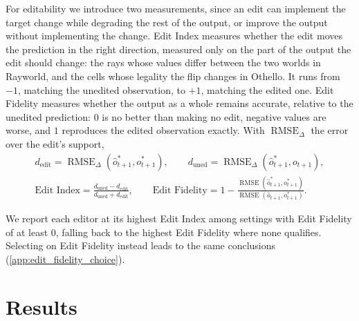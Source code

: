 \documentclass{article} %
\begin{document}
For editability we introduce two measurements, since an edit can implement the target change while degrading the rest of the output, or improve the output without implementing the change. Edit Index measures whether the edit moves the prediction in the right direction, measured only on the part of the output the edit should change: the rays whose values differ between the two worlds in Rayworld, and the cells whose legality the flip changes in Othello. It runs from $-1$, matching the unedited observation, to $+1$, matching the edited one. Edit Fidelity measures whether the output as a whole remains accurate, relative to the unedited prediction: $0$ is no better than making no edit, negative values are worse, and $1$ reproduces the edited observation exactly. With $\operatorname{RMSE}_{\Delta}$ the error over the edit's support,
\begin{equation}
\label{eq:editability_formulae}
\begin{gathered}
d_{\mathrm{edit}} = \operatorname{RMSE}_{\Delta}(\hat{o}_{t+1}^*, o_{t+1}^*), \qquad
d_{\mathrm{uned}} = \operatorname{RMSE}_{\Delta}(\hat{o}_{t+1}^*, o_{t+1}), \\[0.65em]
\text{Edit Index} = \frac{d_{\mathrm{uned}} - d_{\mathrm{edit}}}{d_{\mathrm{uned}} + d_{\mathrm{edit}}}, \qquad
\text{Edit Fidelity} = 1 - \frac{\operatorname{RMSE}(\hat{o}_{t+1}^*, o_{t+1}^*)}{\operatorname{RMSE}(\hat{o}_{t+1}, o_{t+1}^*)}.
\end{gathered}
\end{equation}

We report each editor at its highest Edit Index among settings with Edit Fidelity of at least $0$, falling back to the highest Edit Fidelity where none qualifies. Selecting on Edit Fidelity instead leads to the same conclusions (\cref{app:edit_fidelity_choice}).



\section{Results}
\label{sec:results}
\end{document}
